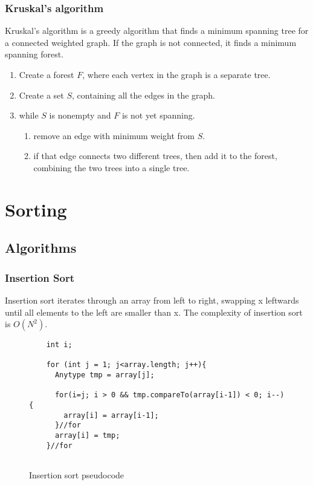 \documentclass[paper=a4, fontsize=11pt]{scrartcl}
\numberwithin{equation}{section} %
\numberwithin{figure}{section} %
\numberwithin{table}{section} %
\theoremstyle{definition}
\begin{document}
\subsubsection{Kruskal's algorithm}
Kruskal's algorithm is a greedy algorithm that finds a minimum spanning tree
for a connected weighted graph.  If the graph is not connected, it finds a
minimum spanning forest.

\begin{enumerate}
  \item Create a forest \(F\), where each vertex in the graph is a separate tree.
  \item Create a set \(S\), containing all the edges in the graph.
  \item while \(S\) is nonempty and \(F\) is not yet spanning.
    \begin{enumerate}
      \item remove an edge with minimum weight from \(S\).
      \item if that edge connects two different trees, then add it to the forest, combining the two trees into a single tree.
    \end{enumerate}
\end{enumerate}

\section{Sorting}

\subsection{Algorithms}

\subsubsection{Insertion Sort}
Insertion sort iterates through an array from left to right, swapping x leftwards until all elements to the left are smaller than x. 
The complexity of insertion sort is $O(N^2)$.


\begin{figure}[p]
  \begin{verbatim}
    int i;
    
    for (int j = 1; j<array.length; j++){
      Anytype tmp = array[j];
      
      for(i=j; i > 0 && tmp.compareTo(array[i-1]) < 0; i--){
        array[i] = array[i-1];
      }//for
      array[i] = tmp;
    }//for
  
  \end{verbatim}
  \caption{Insertion sort pseudocode}
\end{figure}
\end{document}
